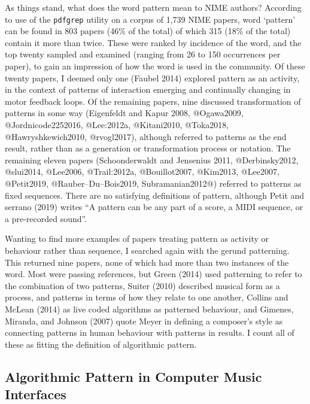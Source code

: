 \documentclass[
]{article}
\begin{document}
As things stand, what does the word pattern mean to NIME authors?
According to use of the \texttt{pdfgrep} utility on a corpus of 1,739
NIME papers, word `pattern' can be found in 803 papers (46\% of the
total) of which 315 (18\% of the total) contain it more than twice.
These were ranked by incidence of the word, and the top twenty sampled
and examined (ranging from 26 to 150 occurrences per paper), to gain an
impression of how the word is used in the community. Of these twenty
papers, I deemed only one (Faubel 2014) explored pattern as an activity,
in the context of patterns of interaction emerging and continually
changing in motor feedback loops. Of the remaining papers, nine
discussed transformation of patterns in some way (Eigenfeldt and Kapur
2008, @Ogawa2009, @Jordnicode2252016, @Lee:2012a, @Kitani2010,
@Toka2018, @Hawryshkewich2010, @rvogl2017), although referred to
patterns as the end result, rather than as a generation or
transformation process or notation. The remaining eleven papers
(Schoonderwaldt and Jensenius 2011, @Derbinsky2012, @slui2014, @Lee2006,
@Trail:2012a, @Bouillot2007, @Kim2013, @Lee2007, @Petit2019,
@Rauber--Du--Bois2019, Subramanian2012@) referred to patterns as fixed
sequences. There are no satisfying definitions of pattern, although
Petit and serrano (2019) writes ``A pattern can be any part of a score,
a MIDI sequence, or a pre-recorded sound''.

Wanting to find more examples of papers treating pattern as activity or
behaviour rather than sequence, I searched again with the gerund
patterning. This returned nine papers, none of which had more than two
instances of the word. Most were passing references, but Green (2014)
used patterning to refer to the combination of two patterns, Suiter
(2010) described musical form as a process, and patterns in terms of how
they relate to one another, Collins and McLean (2014) as live coded
algorithms as patterned behaviour, and Gimenes, Miranda, and Johnson
(2007) quote Meyer in defining a composer's style as connecting patterns
in human behaviour with patterns in results. I count all of these as
fitting the definition of algorithmic pattern.

\hypertarget{algorithmic-pattern-in-computer-music-interfaces}{%
\subsection{Algorithmic Pattern in Computer Music
Interfaces}\label{algorithmic-pattern-in-computer-music-interfaces}}
\end{document}
